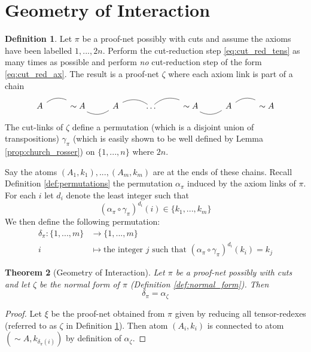 \documentclass[12pt]{article}
\theoremstyle{plain}
\newtheorem{thm}{Theorem}[subsection] %
\theoremstyle{definition}
\newtheorem{defn}[thm]{Definition} %
\newcommand{\lto}{\longrightarrow}
\newcommand{\negation}{\sim}
\begin{document}
\section{Geometry of Interaction}
\begin{defn}\label{def:GoI_permutation}
Let $\pi$ be a proof-net possibly with cuts and assume the axioms have been labelled $1,...,2n$. Perform the cut-reduction step \eqref{eq:cut_red_tens} as many times as possible and perform \emph{no} cut-reduction step of the form \eqref{eq:cut_red_ax}. The result is a proof-net $\zeta$ where each axiom link is part of a chain
\begin{equation}
    \begin{tikzcd}
    A\arrow[r,dash,bend left] & \negation A\arrow[r,dash, bend right] & A\arrow[r,dash,bend left] & \hdots\arrow[r,dash,bend left] & \negation A\arrow[r,dash,bend right] & A\arrow[r,dash,bend left] & \negation A
    \end{tikzcd}
\end{equation}
The cut-links of $\zeta$ define a permutation (which is a disjoint union of transpositions) $\gamma_{\pi}$ (which is easily shown to be well defined by Lemma \ref{prop:church_rosser}) on $\lbrace 1,...,n\rbrace$ where $2n$.

Say the atoms $(A_{1},k_1),...,(A_m,k_m)$ are at the ends of these chains. Recall Definition \ref{def:permutations} the permutation $\alpha_{\pi}$ induced by the axiom links of $\pi$. For each $i$ let $d_i$ denote the least integer such that 
\begin{equation}
(\alpha_{\pi} \circ \gamma_{\pi})^{d_i}(i) \in \lbrace k_1,...,k_m\rbrace    
\end{equation}
We then define the following permutation:
\begin{align*}
    \delta_{\pi}: \lbrace 1,...,m\rbrace &\lto \lbrace 1,...,m\rbrace\\
    i &\longmapsto \text{the integer }j\text{ such that } (\alpha_{\pi} \circ \gamma_{\pi})^{d_i}(k_i) = k_j
\end{align*}
\end{defn}
\begin{thm}[Geometry of Interaction]
Let $\pi$ be a proof-net possibly with cuts and let $\zeta$ be the normal form of $\pi$ (Definition \ref{def:normal_form}). Then
\begin{equation}
    \delta_\pi = \alpha_{\zeta}
\end{equation}
\end{thm}
\begin{proof}
Let $\xi$ be the proof-net obtained from $\pi$ given by reducing all tensor-redexes (referred to as $\zeta$ in Definition \ref{def:GoI_permutation}). Then atom $(A_i,k_i)$ is connected to atom $(\negation A, k_{\delta_{\pi}(i)})$ by definition of $\alpha_{\zeta}$.
\end{proof}
\end{document}
